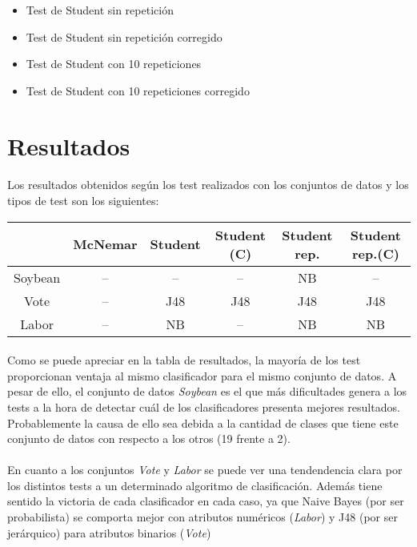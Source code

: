 \documentclass[10pt, a4paper,spanish]{article}
\begin{document}
		\begin{itemize}
			\item Test de Student sin repetición
			\item Test de Student sin repetición corregido
			\item Test de Student con 10 repeticiones
			\item Test de Student con 10 repeticiones corregido
		\end{itemize}

	\section{Resultados}

		\paragraph{}
		Los resultados obtenidos según los test realizados con los conjuntos de datos y los tipos de test son los siguientes:

		\hfill
		\begin{center}
			\begin{tabular}{ | c || c | c | c | c | c | }
				\hline
				 			& McNemar	& Student	& Student (C) 	& Student rep. 	& Student rep.(C) 	\\ \hline \hline
				Soybean 	& -- 		& --		& --			& NB			& --			 	\\ \hline
				Vote 		& -- 		& J48		& J48			& J48			& J48				\\ \hline
				Labor 		& -- 		& NB		& --			& NB			& NB				\\
				\hline
			\end{tabular}
		\end{center}


		\paragraph{}
		Como se puede apreciar en la tabla de resultados, la mayoría de los test proporcionan ventaja al mismo clasificador para el mismo conjunto de datos. A pesar de ello, el conjunto de datos \emph{Soybean} es el que más dificultades genera a los tests a la hora de detectar cuál de los clasificadores presenta mejores resultados. Probablemente la causa de ello sea debida a la cantidad de clases que tiene este conjunto de datos con respecto a los otros (19 frente a 2).

		\paragraph{}
		En cuanto a los conjuntos \emph{Vote} y \emph{Labor} se puede ver una tendendencia clara por los distintos tests a un determinado algoritmo de clasificación. Además tiene sentido la victoria de cada clasificador en cada caso, ya que Naive Bayes (por ser probabilista) se comporta mejor con atributos numéricos (\emph{Labor}) y J48 (por ser jerárquico) para atributos binarios (\emph{Vote})
\end{document}
